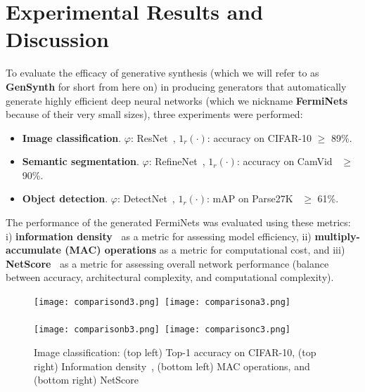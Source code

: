 \documentclass{article}
\begin{document}
\section{Experimental Results and Discussion}
\vspace{-0.15in}
To evaluate the efficacy of generative synthesis (which we will refer to as \textbf{GenSynth} for short from here on) in producing generators that automatically generate highly efficient deep neural networks (which we nickname \textbf{FermiNets} because of their very small sizes), three experiments were performed:
\vspace{-0.25in}
\begin{itemize}
\item \textbf{Image classification}. $\varphi$: ResNet~\cite{ResNet}, $1_r(\cdot)$: accuracy on CIFAR-10 $\geq$ 89\%.
\item \textbf{Semantic segmentation}. $\varphi$: RefineNet~\cite{RefineNet}, $1_r(\cdot)$: accuracy on CamVid~\cite{CamVid} $\geq$ 90\%.
\item \textbf{Object detection}. $\varphi$: DetectNet~\cite{DetectNet}, $1_r(\cdot)$: mAP on Parse27K~\cite{Parse27K} $\geq$ 61\%.
\end{itemize}
\vspace{-0.1in}
The performance of the generated FermiNets was evaluated using these metrics: i) \textbf{information density~\cite{Canziani}} as a metric for assessing model efficiency, ii) \textbf{multiply-accumulate (MAC) operations} as a metric for computational cost, and iii) \textbf{NetScore~\cite{NetScore}} as a metric for assessing overall network performance (balance between accuracy, architectural complexity, and computational complexity).

\begin{figure*}
	\centering
\vspace{-0.1in}
	\texttt{[image: comparisond3.png]}~\texttt{[image: comparisona3.png]}\\~\\
\vspace{-0.15in}
\texttt{[image: comparisonb3.png]}~\texttt{[image: comparisonc3.png]}
\vspace{-0.14in}
	\caption{Image classification: (top left) Top-1 accuracy on CIFAR-10, (top right) Information density~\cite{Canziani}, (bottom left) MAC operations, and (bottom right) NetScore~\cite{NetScore}}
\vspace{-0.11in}
	\label{fig6}
\end{figure*}
\end{document}
